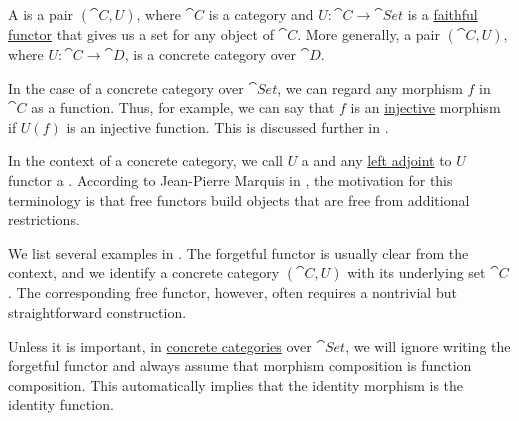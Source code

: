 \begin{definition}\label{def:concrete_category}
  A  is a pair \( (\cat{C}, U) \), where \( \cat{C} \) is a category and \( U: \cat{C} \to \cat{Set} \) is a \hyperref[def:functor_invertibility/faithful]{faithful functor} that gives us a set for any object of \( \cat{C} \). More generally, a pair \( (\cat{C}, U) \), where \( U: \cat{C} \to \cat{D} \), is a concrete category over \( \cat{D} \).

  In the case of a concrete category over \( \cat{Set} \), we can regard any morphism \( f \) in \( \cat{C} \) as a function. Thus, for example, we can say that \( f \) is an \hyperref[def:function_invertibility/injective]{injective} morphism if \( U(f) \) is an injective function. This is discussed further in .

  In the context of a concrete category, we call \( U \) a  and any \hyperref[def:category_adjunction]{left adjoint} to \( U \) functor a . According to Jean-Pierre Marquis in \cite{StanfordPlato:category_theory}, the motivation for this terminology is that free functors build objects that are free from additional restrictions.

  We list several examples in . The forgetful functor is usually clear from the context, and we identify a concrete category \( (\cat{C}, U) \) with its underlying set \( \cat{C} \). The corresponding free functor, however, often requires a nontrivial but straightforward construction.
\end{definition}

\begin{remark}\label{rem:concrete_categories}
  Unless it is important, in \hyperref[def:concrete_category]{concrete categories} over \( \cat{Set} \), we will ignore writing the forgetful functor and always assume that morphism composition is function composition. This automatically implies that the identity morphism is the identity function.
\end{remark}

